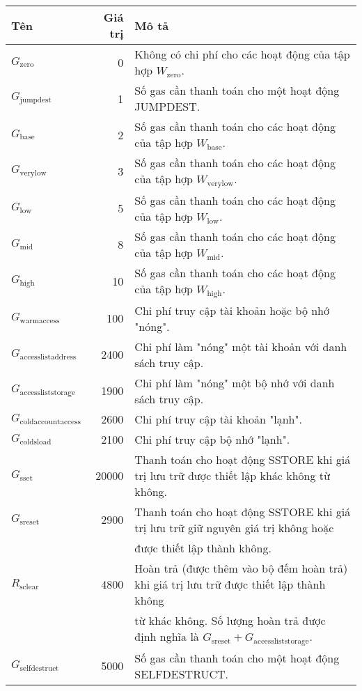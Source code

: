 \documentclass[9pt,oneside]{amsart}
\begin{document}
\nopagebreak
\begin{tabu}{l r l}
\toprule
Tên & Giá trị & Mô tả \\
\midrule
$G_{\mathrm{zero}}$ & 0 & Không có chi phí cho các hoạt động của tập hợp {\small $W_{\mathrm{zero}}$}. \\
$G_{\mathrm{jumpdest}}$ & 1 & Số gas cần thanh toán cho một hoạt động {\small JUMPDEST}. \\
$G_{\mathrm{base}}$ & 2 & Số gas cần thanh toán cho các hoạt động của tập hợp {\small $W_{\mathrm{base}}$}. \\
$G_{\mathrm{verylow}}$ & 3 & Số gas cần thanh toán cho các hoạt động của tập hợp {\small $W_{\mathrm{verylow}}$}. \\
$G_{\mathrm{low}}$ & 5 & Số gas cần thanh toán cho các hoạt động của tập hợp {\small $W_{\mathrm{low}}$}. \\
$G_{\mathrm{mid}}$ & 8 & Số gas cần thanh toán cho các hoạt động của tập hợp {\small $W_{\mathrm{mid}}$}. \\
$G_{\mathrm{high}}$ & 10 & Số gas cần thanh toán cho các hoạt động của tập hợp {\small $W_{\mathrm{high}}$}. \\
$G_{\mathrm{warmaccess}}$ & 100 & Chi phí truy cập tài khoản hoặc bộ nhớ "nóng". \\
$G_{\mathrm{accesslistaddress}}$ & 2400 & Chi phí làm "nóng" một tài khoản với danh sách truy cập. \\
$G_{\mathrm{accessliststorage}}$ & 1900 & Chi phí làm "nóng" một bộ nhớ với danh sách truy cập. \\
$G_{\mathrm{coldaccountaccess}}$ & 2600 & Chi phí truy cập tài khoản "lạnh". \\
$G_{\mathrm{coldsload}}$ & 2100 & Chi phí truy cập bộ nhớ "lạnh". \\
$G_{\mathrm{sset}}$ & 20000 & Thanh toán cho hoạt động {\small SSTORE} khi giá trị lưu trữ được thiết lập khác không từ không. \\
$G_{\mathrm{sreset}}$ & 2900 & Thanh toán cho hoạt động {\small SSTORE} khi giá trị lưu trữ giữ nguyên giá trị không hoặc \\
&& được thiết lập thành không. \\
$R_{\mathrm{sclear}}$ & 4800 & Hoàn trả (được thêm vào bộ đếm hoàn trả) khi giá trị lưu trữ được thiết lập thành không\\
&&từ khác không. Số lượng hoàn trả được định nghĩa là $G_{\mathrm{sreset}} + G_{\mathrm{accessliststorage}}$. \\
$G_{\mathrm{selfdestruct}}$ & 5000 & Số gas cần thanh toán cho một hoạt động {\small SELFDESTRUCT}. \\

\end{tabu}
\end{document}

